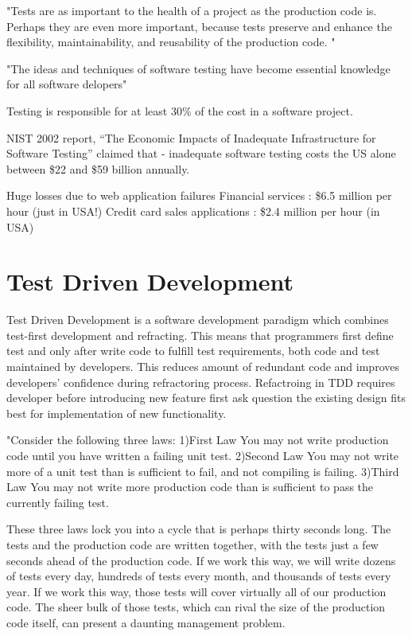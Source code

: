 "Tests are as important to the health of a project as the production code is. 
Perhaps they are even more important, because tests preserve and enhance the flexibility, maintainability, and reusability of the production code. "\cite{MartinClean}

"The ideas and techniques of software testing have become essential knowledge for all software delopers"\cite{IntroductionST}

Testing is responsible for at least 30\% of the cost in a software project.\cite{Lecture2}

NIST 2002 report, “The Economic Impacts of Inadequate Infrastructure for Software Testing” claimed that - inadequate software testing costs the US alone between \$22 and \$59 billion annually. \cite{Lecture1}

Huge losses due to web application failures
Financial services : \$6.5 million per hour (just in USA!)
Credit card sales applications : \$2.4 million per hour (in USA)
\cite{Lecture1}

\section{Test Driven Development}

Test Driven Development is a software development paradigm which combines test-first development and refracting. This means that programmers first define test and only after write code to fulfill test requirements, both code and test maintained by developers. This reduces amount of redundant code and improves developers' confidence during refractoring process.
Refactroing in TDD requires developer before introducing new feature first ask question the existing design fits best for implementation of new functionality.\cite{tdd} \cite{TDDPractical}

"Consider the following three laws:
1)First Law You may not write production code until you have written a failing unit test.
2)Second Law You may not write more of a unit test than is sufficient to fail, and not compiling is failing.
3)Third Law You may not write more production code than is sufficient to pass the currently failing test.

These three laws lock you into a cycle that is perhaps thirty seconds long.
The tests and the production code are written together, with the tests just a few seconds ahead of the production code. 
If we work this way, we will write dozens of tests every day, hundreds of tests every month, and thousands of tests every year. 
If we work this way, those tests will cover virtually all of our production code. 
The sheer bulk of those tests, which can rival the size of the production code itself, can present a daunting management problem.\cite{MartinClean}

